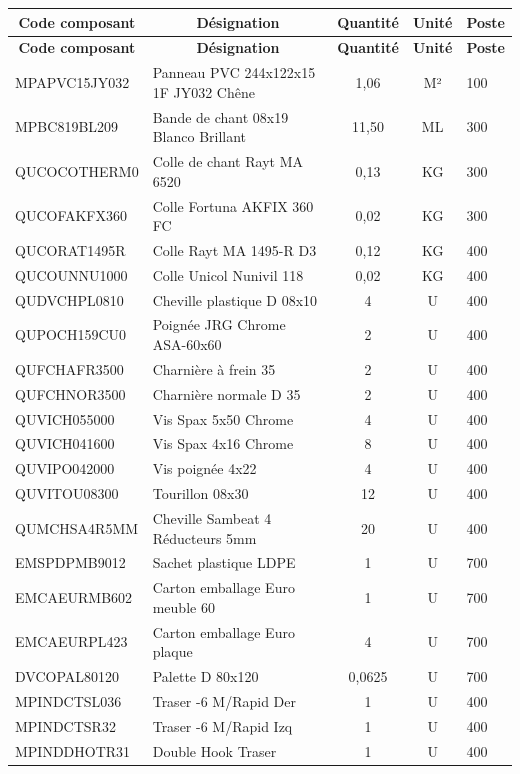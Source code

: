 \documentclass[12pt,a4paper]{article}
\begin{document}
\begin{longtable}{|p{3.5cm}|p{6cm}|c|c|p{2.5cm}|}
\hline
\multicolumn{1}{|c|}{\textbf{Code composant}} & \multicolumn{1}{c|}{\textbf{Désignation}} & \multicolumn{1}{c|}{\textbf{Quantité}} & \multicolumn{1}{c|}{\textbf{Unité}} & \multicolumn{1}{c|}{\textbf{Poste}} \\
\hline
\endfirsthead
\hline
\multicolumn{1}{|c|}{\textbf{Code composant}} & \multicolumn{1}{c|}{\textbf{Désignation}} & \multicolumn{1}{c|}{\textbf{Quantité}} & \multicolumn{1}{c|}{\textbf{Unité}} & \multicolumn{1}{c|}{\textbf{Poste}} \\
\hline
\endhead
\hline
\endfoot
MPAPVC15JY032 & Panneau PVC 244x122x15 1F JY032 Chêne & 1,06 & M² & 100 \\
MPBC819BL209 & Bande de chant 08x19 Blanco Brillant & 11,50 & ML & 300 \\
QUCOCOTHERM0 & Colle de chant Rayt MA 6520 & 0,13 & KG & 300 \\
QUCOFAKFX360 & Colle Fortuna AKFIX 360 FC & 0,02 & KG & 300 \\
QUCORAT1495R & Colle Rayt MA 1495-R D3 & 0,12 & KG & 400 \\
QUCOUNNU1000 & Colle Unicol Nunivil 118 & 0,02 & KG & 400 \\
QUDVCHPL0810 & Cheville plastique D 08x10 & 4 & U & 400 \\
QUPOCH159CU0 & Poignée JRG Chrome ASA-60x60 & 2 & U & 400 \\
QUFCHAFR3500 & Charnière à frein 35 & 2 & U & 400 \\
QUFCHNOR3500 & Charnière normale D 35 & 2 & U & 400 \\
QUVICH055000 & Vis Spax 5x50 Chrome & 4 & U & 400 \\
QUVICH041600 & Vis Spax 4x16 Chrome & 8 & U & 400 \\
QUVIPO042000 & Vis poignée 4x22 & 4 & U & 400 \\
QUVITOU08300 & Tourillon 08x30 & 12 & U & 400 \\
QUMCHSA4R5MM & Cheville Sambeat 4 Réducteurs 5mm & 20 & U & 400 \\
EMSPDPMB9012 & Sachet plastique LDPE & 1 & U & 700 \\
EMCAEURMB602 & Carton emballage Euro meuble 60 & 1 & U & 700 \\
EMCAEURPL423 & Carton emballage Euro plaque & 4 & U & 700 \\
DVCOPAL80120 & Palette D 80x120 & 0,0625 & U & 700 \\
MPINDCTSL036 & Traser -6 M/Rapid Der & 1 & U & 400 \\
MPINDCTSR32 & Traser -6 M/Rapid Izq & 1 & U & 400 \\
MPINDDHOTR31 & Double Hook Traser & 1 & U & 400 \\
\hline
\end{longtable}
\end{document}
